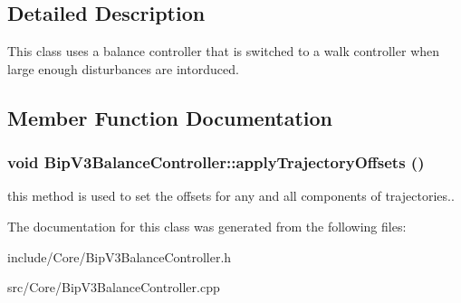 \subsection{Detailed Description}
This class uses a balance controller that is switched to a walk controller when large enough disturbances are intorduced. 

\subsection{Member Function Documentation}
\hypertarget{classCartWheel_1_1Core_1_1BipV3BalanceController_a8414520a87f159250443f0f07c5f162b}{
\subsubsection[{applyTrajectoryOffsets}]{\setlength{\rightskip}{0pt plus 5cm}void BipV3BalanceController::applyTrajectoryOffsets ()}}
\label{classCartWheel_1_1Core_1_1BipV3BalanceController_a8414520a87f159250443f0f07c5f162b}
this method is used to set the offsets for any and all components of trajectories.. 

The documentation for this class was generated from the following files:\begin{DoxyCompactItemize}
\item 
include/Core/BipV3BalanceController.h\item 
src/Core/BipV3BalanceController.cpp\end{DoxyCompactItemize}
